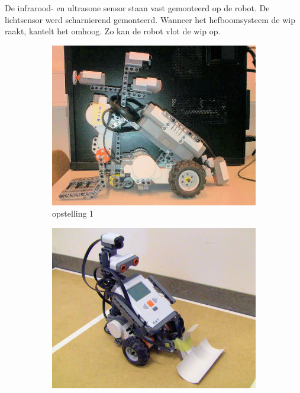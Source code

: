 \documentclass[tt3]{penoverslag}
\begin{document}
De infrarood- en ultrasone sensor staan vast gemonteerd op de robot. De lichtsensor werd scharnierend gemonteerd. Wanneer het hefboomsysteem de wip raakt, kantelt het omhoog. Zo kan de robot vlot de wip op.


\begin{figure}
\centering
	\begin{subfigure}[h]{0.325\textwidth}
	\centering
		\includegraphics[width=\textwidth]{robotOud1}
		\caption{opstelling 1}
		\label{fig:robotOud1}
	\end{subfigure}
	\begin{subfigure}[h]{0.325\textwidth}
		\centering
		\includegraphics[width=\textwidth]{robotOud2}

\end{subfigure}
\end{figure}
\end{document}
